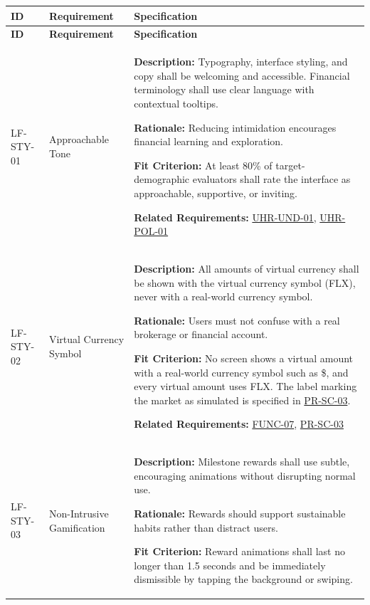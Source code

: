 \documentclass[12pt]{article}
\begin{document}
\small
\setlength{\tabcolsep}{4pt}
\begin{xltabular}{\textwidth}{|p{2.6cm}|p{3.4cm}|X|}
\hline
\textbf{ID} & \textbf{Requirement} & \textbf{Specification} \\
\hline
\endfirsthead
\hline
\textbf{ID} & \textbf{Requirement} & \textbf{Specification} \\
\hline
\endhead

LF-STY-01\hypertarget{req:LF-STY-01}{} &
Approachable Tone &
\textbf{Description:} Typography, interface styling, and copy shall be welcoming and accessible. Financial terminology shall use clear language with contextual tooltips.

\textbf{Rationale:} Reducing intimidation encourages financial learning and exploration.

\textbf{Fit Criterion:} At least 80\% of target-demographic evaluators shall rate the interface as approachable, supportive, or inviting.

\textbf{Related Requirements:} \hyperlink{req:UHR-UND-01}{UHR-UND-01}, \hyperlink{req:UHR-POL-01}{UHR-POL-01}\\
\hline

LF-STY-02\hypertarget{req:LF-STY-02}{} &
Virtual Currency Symbol &
\textbf{Description:} All amounts of virtual currency shall be shown with the virtual currency symbol (FLX), never with a real-world currency symbol.

\textbf{Rationale:} Users must not confuse \progname{} with a real brokerage or financial account.

\textbf{Fit Criterion:} No screen shows a virtual amount with a real-world currency symbol such as \$, and every virtual amount uses FLX. The label marking the market as simulated is specified in \hyperlink{req:PR-SC-03}{PR-SC-03}.

\textbf{Related Requirements:} \hyperlink{req:FUNC-07}{FUNC-07}, \hyperlink{req:PR-SC-03}{PR-SC-03}\\
\hline

LF-STY-03\hypertarget{req:LF-STY-03}{} &
Non-Intrusive Gamification &
\textbf{Description:} Milestone rewards shall use subtle, encouraging animations without disrupting normal use.

\textbf{Rationale:} Rewards should support sustainable habits rather than distract users.

\textbf{Fit Criterion:} Reward animations shall last no longer than 1.5 seconds and be immediately dismissible by tapping the background or swiping.


\end{xltabular}
\end{document}

